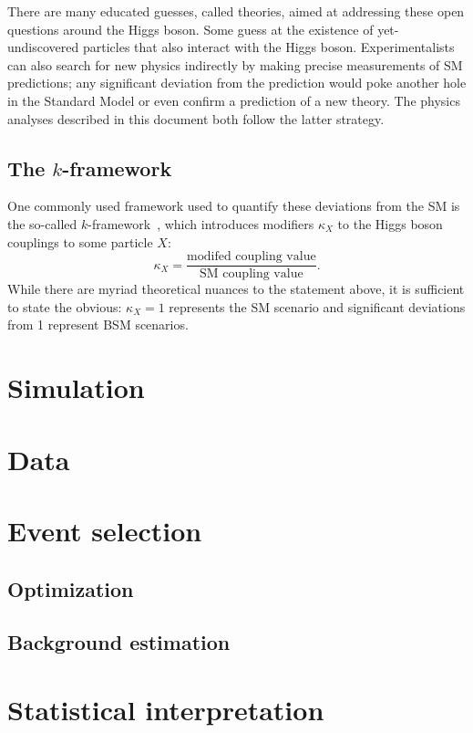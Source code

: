 There are many educated guesses, called theories, aimed at addressing these open questions around the Higgs boson. 
Some guess at the existence of yet-undiscovered particles that also interact with the Higgs boson\footnotemark{}. 
Experimentalists can also search for new physics indirectly by making precise measurements of SM predictions; any significant deviation from the prediction would poke another hole in the Standard Model or even confirm a prediction of a new theory. 
The physics analyses described in this document both follow the latter strategy.

\subsection{The $k$-framework}
One commonly used framework used to quantify these deviations from the SM is the so-called $k$-framework~\cite{KFrame}, which introduces modifiers $\kappa_X$ to the Higgs boson couplings to some particle $X$:
\begin{equation}
    \kappa_X = \frac{\text{modifed coupling value}}{\text{SM coupling value}}.
\end{equation}
While there are myriad theoretical nuances to the statement above, it is sufficient to state the obvious: $\kappa_X = 1$ represents the SM scenario and significant deviations from 1 represent BSM scenarios. 

\section{Simulation}

\section{Data}

\section{Event selection}
\subsection{Optimization}
\subsection{Background estimation}

\section{Statistical interpretation}
